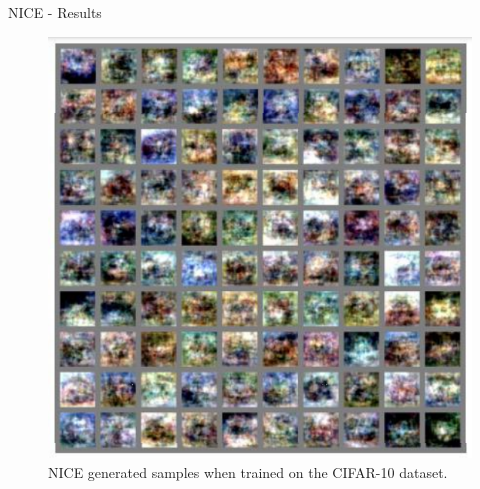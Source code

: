 \begin{frame}[allowframebreaks]{NICE - Results}
\begin{figure}
    \centering
    \includegraphics[height=0.8\textheight, width=\textwidth, keepaspectratio]{images/norm-flow/nfm_nice_cifar.png}
    \caption*{NICE generated samples when trained on the CIFAR-10 dataset.}
\end{figure}
    
\end{frame}